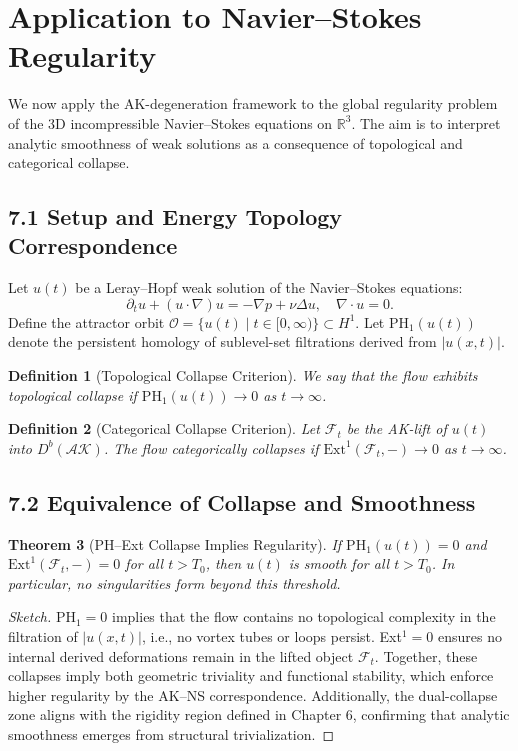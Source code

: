 \documentclass[11pt]{article}
\newtheorem{theorem}{Theorem}[section]
\newtheorem{definition}[theorem]{Definition}
\begin{document}
\section{Application to Navier--Stokes Regularity}

We now apply the AK-degeneration framework to the global regularity problem of the 3D incompressible Navier--Stokes equations on $\mathbb{R}^3$. The aim is to interpret analytic smoothness of weak solutions as a consequence of topological and categorical collapse.

\subsection{7.1 Setup and Energy Topology Correspondence}

Let $u(t)$ be a Leray–Hopf weak solution of the Navier--Stokes equations:
\[
\partial_t u + (u \cdot \nabla) u = -\nabla p + \nu \Delta u, \quad \nabla \cdot u = 0.
\]
Define the attractor orbit $\mathcal{O} = \{ u(t) \mid t \in [0, \infty) \} \subset H^1$. Let $\mathrm{PH}_1(u(t))$ denote the persistent homology of sublevel-set filtrations derived from $|u(x,t)|$.

\begin{definition}[Topological Collapse Criterion]
We say that the flow exhibits topological collapse if $\mathrm{PH}_1(u(t)) \to 0$ as $t \to \infty$.
\end{definition}

\begin{definition}[Categorical Collapse Criterion]
Let $\mathcal{F}_t$ be the AK-lift of $u(t)$ into $D^b(\mathcal{AK})$. The flow categorically collapses if $\mathrm{Ext}^1(\mathcal{F}_t, -) \to 0$ as $t \to \infty$.
\end{definition}

\subsection{7.2 Equivalence of Collapse and Smoothness}

\begin{theorem}[PH--Ext Collapse Implies Regularity]
If $\mathrm{PH}_1(u(t)) = 0$ and $\mathrm{Ext}^1(\mathcal{F}_t, -) = 0$ for all $t > T_0$, then $u(t)$ is smooth for all $t > T_0$. In particular, no singularities form beyond this threshold.
\end{theorem}

\begin{proof}[Sketch]
PH$_1 = 0$ implies that the flow contains no topological complexity in the filtration of $|u(x,t)|$, i.e., no vortex tubes or loops persist. Ext$^1 = 0$ ensures no internal derived deformations remain in the lifted object $\mathcal{F}_t$. Together, these collapses imply both geometric triviality and functional stability, which enforce higher regularity by the AK–NS correspondence. Additionally, the dual-collapse zone aligns with the rigidity region defined in Chapter 6, confirming that analytic smoothness emerges from structural trivialization.
\end{proof}
\end{document}
